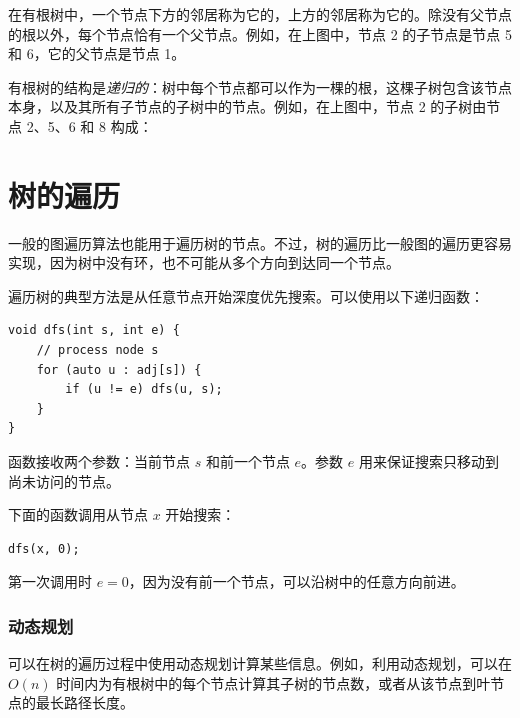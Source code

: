 在有根树中，一个节点下方的邻居称为它的，上方的邻居称为它的。除没有父节点的根以外，每个节点恰有一个父节点。例如，在上图中，节点 2 的子节点是节点 5 和 6，它的父节点是节点 1。


有根树的结构是\emph{递归的}：树中每个节点都可以作为一棵的根，这棵子树包含该节点本身，以及其所有子节点的子树中的节点。例如，在上图中，节点 2 的子树由节点 2、5、6 和 8 构成：
\begin{center}
\end{center}

\section{树的遍历}

一般的图遍历算法也能用于遍历树的节点。不过，树的遍历比一般图的遍历更容易实现，因为树中没有环，也不可能从多个方向到达同一个节点。

遍历树的典型方法是从任意节点开始深度优先搜索。可以使用以下递归函数：

\begin{lstlisting}
void dfs(int s, int e) {
    // process node s
    for (auto u : adj[s]) {
        if (u != e) dfs(u, s);
    }
}
\end{lstlisting}

函数接收两个参数：当前节点 $s$ 和前一个节点 $e$。参数 $e$ 用来保证搜索只移动到尚未访问的节点。

下面的函数调用从节点 $x$ 开始搜索：

\begin{lstlisting}
dfs(x, 0);
\end{lstlisting}

第一次调用时 $e=0$，因为没有前一个节点，可以沿树中的任意方向前进。

\subsubsection{动态规划}

可以在树的遍历过程中使用动态规划计算某些信息。例如，利用动态规划，可以在 $O(n)$ 时间内为有根树中的每个节点计算其子树的节点数，或者从该节点到叶节点的最长路径长度。

